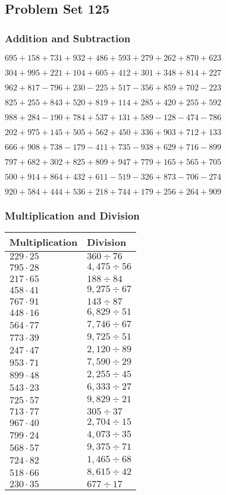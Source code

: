 \hypertarget{problem-set-125}{%
\subsection{Problem Set 125}\label{problem-set-125}}

\hypertarget{addition-and-subtraction}{%
\subsubsection{Addition and
Subtraction}\label{addition-and-subtraction}}

\(695 +158 +731 +932 +486 +593 +279 +262 +870 +623\)

\(304 +995 +221 +104 +605 +412 +301 +348 +814 +227\)

\(962 +817 - 796 +230 - 225 +517 - 356 +859 +702 - 223\)

\(825 +255 +843 +520 +819 +114 +285 +420 +255 +592\)

\(988 +284 - 190 +784 +537 +131 +589 - 128 - 474 - 786\)

\(202 +975 +145 +505 +562 +450 +336 +903 +712 +133\)

\(666 +908 +738 - 179 - 411 +735 - 938 +629 +716 - 899\)

\(797 +682 +302 +825 +809 +947 +779 +165 +565 +705\)

\(500 +914 +864 +432 +611 - 519 - 326 +873 - 706 - 274\)

\(920 +584 +444 +536 +218 +744 +179 +256 +264 +909\)

\hypertarget{multiplication-and-division}{%
\subsubsection{Multiplication and
Division}\label{multiplication-and-division}}

\begin{longtable}[]{@{}ll@{}}
\toprule
Multiplication & Division\tabularnewline
\midrule
\endhead
\(229 \cdot 25\) & \(360÷76\)\tabularnewline
\(795 \cdot 28\) & \(4,475÷56\)\tabularnewline
\(217 \cdot 65\) & \(188÷84\)\tabularnewline
\(458 \cdot 41\) & \(9,275÷67\)\tabularnewline
\(767 \cdot 91\) & \(143 ÷ 87\)\tabularnewline
\(448 \cdot 16\) & \(6,829÷51\)\tabularnewline
\(564 \cdot 77\) & \(7,746÷67\)\tabularnewline
\(773 \cdot 39\) & \(9,725÷51\)\tabularnewline
\(247 \cdot 47\) & \(2,120÷89\)\tabularnewline
\(953 \cdot 71\) & \(7,590÷29\)\tabularnewline
\(899 \cdot 48\) & \(2,255÷45\)\tabularnewline
\(543 \cdot 23\) & \(6,333÷27\)\tabularnewline
\(725 \cdot 57\) & \(9,829÷21\)\tabularnewline
\(713 \cdot 77\) & \(305÷37\)\tabularnewline
\(967 \cdot 40\) & \(2,704÷15\)\tabularnewline
\(799 \cdot 24\) & \(4,073÷35\)\tabularnewline
\(568 \cdot 57\) & \(9,375÷71\)\tabularnewline
\(724 \cdot 82\) & \(1,465÷68\)\tabularnewline
\(518 \cdot 66\) & \(8,615÷42\)\tabularnewline
\(230 \cdot 35\) & \(677÷17\)\tabularnewline
\bottomrule
\end{longtable}
